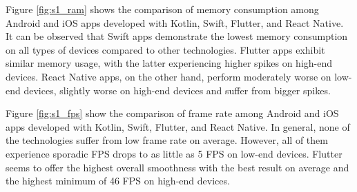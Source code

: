 Figure \ref{fig:s1_ram} shows the comparison of memory consumption among Android and iOS apps developed with Kotlin, Swift, Flutter, and React Native. It can be observed that Swift apps demonstrate the lowest memory consumption on all types of devices compared to other technologies. Flutter apps exhibit similar memory usage, with the latter experiencing higher spikes on high-end devices. React Native apps, on the other hand, perform moderately worse on low-end devices, slightly worse on high-end devices and suffer from bigger spikes.

\bigskip

Figure \ref{fig:s1_fps} show the comparison of frame rate among Android and iOS apps developed with Kotlin, Swift, Flutter, and React Native. In general, none of the technologies suffer from low frame rate on average. However, all of them experience sporadic FPS drops to as little as 5 FPS on low-end devices. Flutter seems to offer the highest overall smoothness with the best result on average and the highest minimum of 46 FPS on high-end devices.
